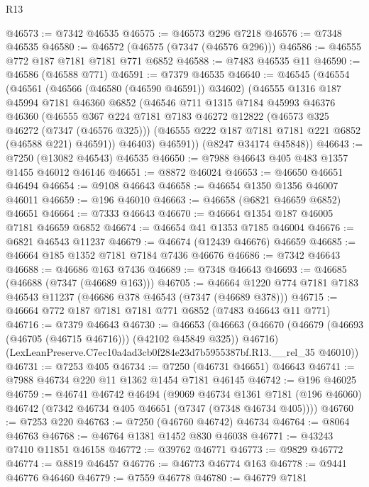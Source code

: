 \begin{lexlean}{R13}
\begin{coremodule}
@46573 := @7342 @46535
@46575 := @46573 @296 @7218
@46576 := @7348 @46535
@46580 := @46572 (@46575 (@7347 (@46576 @296)))
@46586 := @46555 @772 @187 @7181 @7181 @771 @6852
@46588 := @7483 @46535 @11
@46590 := @46586 (@46588 @771)
@46591 := @7379 @46535
@46640 := @46545
    (@46554
      (@46561
        (@46566 (@46580 (@46590 @46591)) @34602)
        (@46555
          @1316
          @187
          @45994
          @7181
          @46360
          @6852
          (@46546
            @711
            @1315
            @7184
            @45993
            @46376
            @46360
            (@46555
              @367
              @224
              @7181
              @7183
              @46272
              @12822
              (@46573 @325 @46272 (@7347 (@46576 @325)))
              (@46555 @222 @187 @7181 @7181 @221 @6852 (@46588 @221) @46591))
            @46403)
          @46591))
      (@8247 @34174 @45848))
@46643 := @7250 (@13082 @46543) @46535
@46650 := @7988 @46643 @405 @483 @1357 @1455 @46012 @46146
@46651 := @8872 @46024
@46653 := @46650 @46651 @46494
@46654 := @9108 @46643
@46658 := @46654 @1350 @1356 @46007 @46011
@46659 := @196 @46010
@46663 := @46658 (@6821 @46659 @6852) @46651
@46664 := @7333 @46643
@46670 := @46664 @1354 @187 @46005 @7181 @46659 @6852
@46674 := @46654 @41 @1353 @7185 @46004
@46676 := @6821 @46543 @11237
@46679 := @46674 (@12439 @46676) @46659
@46685 := @46664 @185 @1352 @7181 @7184 @7436 @46676
@46686 := @7342 @46643
@46688 := @46686 @163 @7436
@46689 := @7348 @46643
@46693 := @46685 (@46688 (@7347 (@46689 @163)))
@46705 := @46664 @1220 @774 @7181 @7183 @46543 @11237 (@46686 @378 @46543 (@7347 (@46689 @378)))
@46715 := @46664 @772 @187 @7181 @7181 @771 @6852 (@7483 @46643 @11 @771)
@46716 := @7379 @46643
@46730 := @46653
    (@46663
      (@46670 (@46679 (@46693 (@46705 (@46715 @46716))) (@42102 @45849 @325)) @46716)
      (LexLeanPreserve.C7ec10a4ad3cb0f284e23d7b5955387bf.R13.__rel_35 @46010))
@46731 := @7253 @405
@46734 := @7250 (@46731 @46651) @46643
@46741 := @7988 @46734 @220 @11 @1362 @1454 @7181 @46145
@46742 := @196 @46025
@46759 := @46741
    @46742
    @46494
    (@9069
      @46734
      @1361
      @7181
      (@196 @46060)
      @46742
      (@7342 @46734 @405 @46651 (@7347 (@7348 @46734 @405))))
@46760 := @7253 @220
@46763 := @7250 (@46760 @46742) @46734
@46764 := @8064 @46763
@46768 := @46764 @1381 @1452 @830 @46038
@46771 := @43243 @7410 @11851 @46158
@46772 := @39762 @46771
@46773 := @9829 @46772
@46774 := @8819 @46457
@46776 := @46773 @46774 @163
@46778 := @9441 @46776 @46460
@46779 := @7559 @46778
@46780 := @46779 @7181

\end{coremodule}
\end{lexlean}
